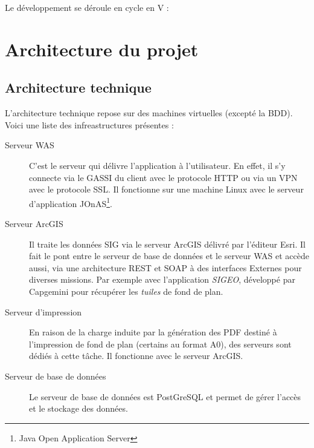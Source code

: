 Le développement se déroule en cycle en V :



\section{Architecture du projet}
\subsection{Architecture technique}
L'architecture technique repose sur des machines virtuelles (excepté la BDD).
Voici une liste des infreastructures présentes :
\begin{description}
	\item[Serveur WAS] C'est le serveur qui délivre l'application à l'utilisateur. En effet, il s'y connecte via le GASSI du client avec le protocole HTTP ou via un VPN avec le protocole SSL. Il fonctionne sur une machine Linux avec le serveur d'application JOnAS\footnote{Java Open Application Server}.
\item[Serveur ArcGIS] Il traite les données SIG via le serveur ArcGIS délivré par l'éditeur Esri. Il fait le pont entre le serveur de base de données et le serveur WAS et accède aussi, via une architecture REST et SOAP à des interfaces Externes pour diverses missions. Par exemple avec l'application \textit{SIGEO}, développé par Capgemini pour récupérer les \textit{tuiles} de fond de plan.
\item[Serveur d'impression] En raison de la charge induite par la génération des PDF destiné à l'impression de fond de plan (certains au format A0), des serveurs sont dédiés à cette tâche. Il fonctionne avec le serveur ArcGIS.
\item[Serveur de base de données] Le serveur de base de données est PostGreSQL et permet de gérer l'accès et le stockage des données.\\
\end{description}

